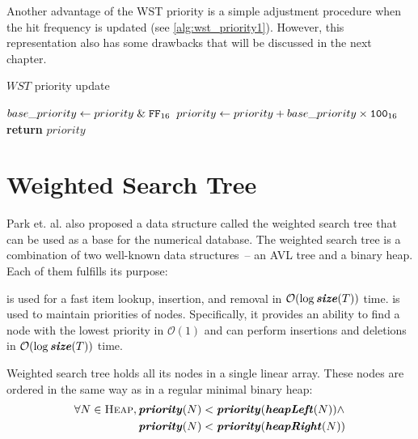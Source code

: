 Another advantage of the WST priority is a simple adjustment procedure when the hit frequency is updated (see \cref{alg:wst_priority1}). However, this representation also has some drawbacks that will be discussed in the next chapter.
\begin{algorithm}
\caption{$WST$ priority update}\label{alg:wst_priority1}
\begin{algorithmic}[1]
    \State $base\_priority\gets priority \mathrel{\&} \texttt{FF}_{16}$
    \State $priority \gets priority + base\_priority \times \texttt{100}_{16}$
    \State {}
    \State \textbf{return} $priority$
  \EndProcedure
\end{algorithmic}
\end{algorithm}

\section{Weighted Search Tree}

Park et. al. also proposed a data structure called the weighted search tree that can be used as a base for the numerical database. The weighted search tree is a combination of two well-known data structures~-- an AVL tree and a binary heap. Each of them fulfills its purpose:
\begin{block-description}
 is used for a fast item lookup, insertion, and removal in $\mathcal{O}(\log{\ensuremath{\textbf{\textit{size}}(T)}})$ time.
 is used to maintain priorities of nodes. Specifically, it provides an ability to find a node with the lowest priority in $\mathcal{O}(1)$ and can perform insertions and deletions in $\mathcal{O}(\log{\ensuremath{\textbf{\textit{size}}(T)}})$ time.
\end{block-description}

Weighted search tree holds all its nodes in a single linear array. These nodes are ordered in the same way as in a regular minimal binary heap:
\begin{equation}
\begin{aligned}
  \forall N \in \textsc{Heap},{}
     & \textbf{\textit{priority}}(N) < \textbf{\textit{priority}}(\textbf{\textit{heapLeft}}(N)) {} \land \\
     & \textbf{\textit{priority}}(N) < \textbf{\textit{priority}}(\textbf{\textit{heapRight}}(N))
\end{aligned}
\end{equation}

